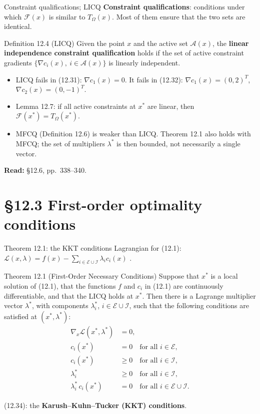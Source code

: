 \documentclass[aspectratio=169,12pt]{beamer}
\newcommand{\xs}{x^{*}}
\newcommand{\eqn}[1]{\text{\small(#1)}}
\newcommand{\readbook}[1]{{\color{red}\textbf{Read:} #1}}
\newcommand{\ls}{\lambda^{*}}
\newcommand{\cA}{\mathcal{A}}
\newcommand{\cE}{\mathcal{E}}
\newcommand{\cF}{\mathcal{F}}
\newcommand{\cI}{\mathcal{I}}
\newcommand{\cL}{\mathcal{L}}
\newcommand{\TO}{T_{\Omega}}
\begin{document}
\begin{frame}{Constraint qualifications; LICQ}
  \textbf{Constraint qualifications}: conditions under which $\cF(x)$ is similar to $\TO(x)$.
  Most of them ensure that the two sets are identical.
  \begin{block}{Definition 12.4 (LICQ)}
    Given the point $x$ and the active set $\cA(x)$, the \textbf{linear independence constraint
    qualification} holds if the set of active constraint gradients
    $\{\nabla c_{i}(x),\ i\in\cA(x)\}$ is linearly independent.
  \end{block}
  \begin{itemize}\setlength\itemsep{0.25em}
    \item LICQ fails in (12.31): $\nabla c_{1}(x)=0$. It fails in (12.32):
      $\nabla c_{1}(x)=(0,2)^{T}$, $\nabla c_{2}(x)=(0,-1)^{T}$.
    \item Lemma 12.7: if all active constraints at $\xs$ are linear, then $\cF(\xs)=\TO(\xs)$.
    \item MFCQ (Definition 12.6) is weaker than LICQ. Theorem 12.1 also holds with MFCQ;
      the set of multipliers $\ls$ is then bounded, not necessarily a single vector.
  \end{itemize}
  \readbook{\S12.6, pp.~338--340.}
\end{frame}

\section{\S12.3 First-order optimality conditions}

\begin{frame}{Theorem 12.1: the KKT conditions}
  Lagrangian for (12.1):\quad
  $\cL(x,\lambda)=f(x)-\sum_{i\in\cE\cup\cI}\lambda_{i}c_{i}(x)$ \eqn{12.33}.
  \begin{block}{Theorem 12.1 (First-Order Necessary Conditions)}
    \small Suppose that $\xs$ is a local solution of (12.1), that the functions $f$ and $c_{i}$ in (12.1) are
    continuously differentiable, and that the LICQ holds at $\xs$. Then there is a Lagrange multiplier
    vector $\ls$, with components $\ls_{i}$, $i\in\cE\cup\cI$, such that the following conditions are
    satisfied at $(\xs,\ls)$:
    \vspace{-0.8em}
    \begin{align}
      \nabla_{x}\cL(\xs,\ls) &= 0, \tag{12.34a}\\[-0.35em]
      c_{i}(\xs) &= 0\quad\text{for all } i\in\cE, \tag{12.34b}\\[-0.35em]
      c_{i}(\xs) &\ge 0\quad\text{for all } i\in\cI, \tag{12.34c}\\[-0.35em]
      \ls_{i} &\ge 0\quad\text{for all } i\in\cI, \tag{12.34d}\\[-0.35em]
      \ls_{i}\,c_{i}(\xs) &= 0\quad\text{for all } i\in\cE\cup\cI. \tag{12.34e}
    \end{align}
  \end{block}
  (12.34): the \textbf{Karush--Kuhn--Tucker (KKT) conditions}.
\end{frame}
\end{document}
